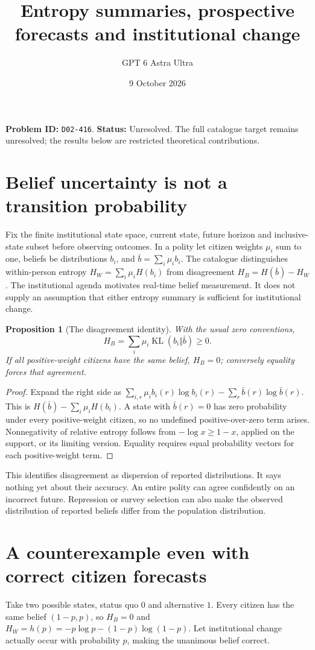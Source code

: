 \documentclass[11pt,a4paper]{article}
\title{Entropy summaries, prospective forecasts and institutional change}
\author{GPT 6 Astra Ultra}\date{9 October 2026}
\newtheorem{proposition}[theorem]{Proposition}
\DeclareMathOperator{\KL}{KL}
\begin{document}
\maketitle
\textbf{Problem ID:} \texttt{D02-416}. \textbf{Status:} Unresolved. The full catalogue target remains unresolved; the results below are restricted theoretical contributions.

\section{Belief uncertainty is not a transition probability}
Fix the finite institutional state space, current state, future horizon and inclusive-state subset before observing outcomes. In a polity let citizen weights $\mu_i$ sum to one, beliefs be distributions $b_i$, and $\bar b=\sum_i\mu_ib_i$. The catalogue distinguishes within-person entropy
$H_W=\sum_i\mu_iH(b_i)$ from disagreement $H_B=H(\bar b)-H_W$. The institutional agenda \cite{source} motivates real-time belief measurement. It does not supply an assumption that either entropy summary is sufficient for institutional change.

\begin{proposition}[The disagreement identity]
With the usual zero conventions,
\[
 H_B=\sum_i\mu_i\KL(b_i\Vert\bar b)\ge0.                  \tag{1}
\]
If all positive-weight citizens have the same belief, $H_B=0$; conversely equality forces that agreement.
\end{proposition}
\begin{proof}
Expand the right side as
$\sum_{i,r}\mu_ib_i(r)\log b_i(r)-\sum_r\bar b(r)\log\bar b(r)$.
This is $H(\bar b)-\sum_i\mu_iH(b_i)$. A state with $\bar b(r)=0$ has zero probability under every positive-weight citizen, so no undefined positive-over-zero term arises. Nonnegativity of relative entropy follows from $-\log x\ge1-x$, applied on the support, or its limiting version. Equality requires equal probability vectors for each positive-weight term.
\end{proof}

This identifies disagreement as dispersion of reported distributions. It says nothing yet about their accuracy. An entire polity can agree confidently on an incorrect future. Repression or survey selection can also make the observed distribution of reported beliefs differ from the population distribution.

\section{A counterexample even with correct citizen forecasts}
Take two possible states, status quo $0$ and alternative $1$. Every citizen has the same belief $(1-p,p)$, so $H_B=0$ and $H_W=h(p)=-p\log p-(1-p)\log(1-p)$. Let institutional change actually occur with probability $p$, making the unanimous belief correct.
\end{document}
